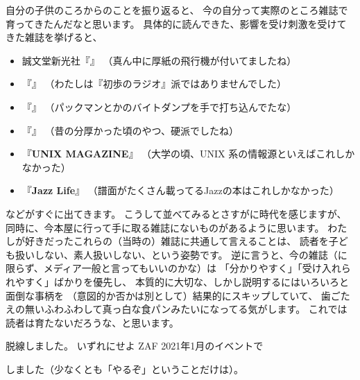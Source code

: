\documentclass[dvipdfmx,autodetect-engine,10pt,b5paper,papersize,openany,dvipsnames]{jsbook}
\begin{document}
\begin{multicols}{2}
自分の子供のころからのことを振り返ると、
今の自分って実際のところ雑誌で育ってきたんだなと思います。
具体的に読んできた、影響を受け刺激を受けてきた雑誌を挙げると、
\begin{itemize}
\item 誠文堂新光社『』
  （真ん中に厚紙の飛行機が付いてましたね）
\item 『』
  （わたしは『初歩のラジオ』派ではありませんでした）
\item 『』
  （パックマンとかのバイトダンプを手で打ち込んでたな）
\item 『』
  （昔の分厚かった頃のやつ、硬派でしたね）
\item 『{\bfseries UNIX MAGAZINE}』
  （大学の頃、UNIX 系の情報源といえばこれしかなかった）
\item 『{\bfseries Jazz Life}』
  （譜面がたくさん載ってるJazzの本はこれしかなかった）
\end{itemize}
などがすぐに出てきます。
こうして並べてみるとさすがに時代を感じますが、
同時に、今本屋に行って手に取る雑誌にないものがあるように思います。
わたしが好きだったこれらの（当時の）雑誌に共通して言えることは、
読者を子ども扱いしない、素人扱いしない、という姿勢です。
逆に言うと、今の雑誌（に限らず、メディア一般と言ってもいいのかな）は
「分かりやすく」「受け入れられやすく」ばかりを優先し、
本質的に大切な、しかし説明するにはいろいろと面倒な事柄を
（意図的か否かは別として）結果的にスキップしていて、
歯ごたえの無いふわふわして真っ白な食パンみたいになってる気がします。
これでは読者は育たないだろうな、と思います。

脱線しました。
いずれにせよ ZAF 2021年1月のイベントで
\begin{center}
  \Large {}
\end{center}
しました（少なくとも「やるぞ」ということだけは）。


\end{multicols}

\end{document}
